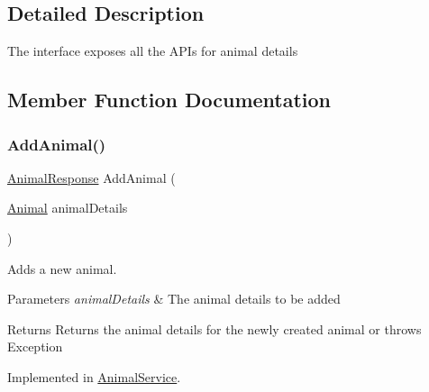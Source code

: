 \subsection{Detailed Description}
The interface exposes all the A\+P\+Is for animal details 



\subsection{Member Function Documentation}
\mbox{\label{interfaceWildLifeTracker_1_1Services_1_1IAnimalService_ae578d708ed9407d8805d69b193eff67b}} 
\subsubsection{\texorpdfstring{Add\+Animal()}{AddAnimal()}}
{\footnotesize\ttfamily \hyperlink{classWildLifeTracker_1_1Response_1_1AnimalResponse}{Animal\+Response} Add\+Animal (\begin{DoxyParamCaption}\item[{\hyperlink{classWildLifeTracker_1_1Models_1_1Animal}{Animal}}]{animal\+Details }\end{DoxyParamCaption})}



Adds a new animal. 
\begin{DoxyParams}{Parameters}
{\em animal\+Details} & The animal details to be added\\
\hline
\end{DoxyParams}
\begin{DoxyReturn}{Returns}
Returns the animal details for the newly created animal or throws Exception
\end{DoxyReturn}




Implemented in \hyperlink{classWildLifeTracker_1_1Services_1_1AnimalService_ae578d708ed9407d8805d69b193eff67b}{Animal\+Service}.

\mbox{\label{interfaceWildLifeTracker_1_1Services_1_1IAnimalService_a201e384747e50bd19c431955eae072fa}} 

